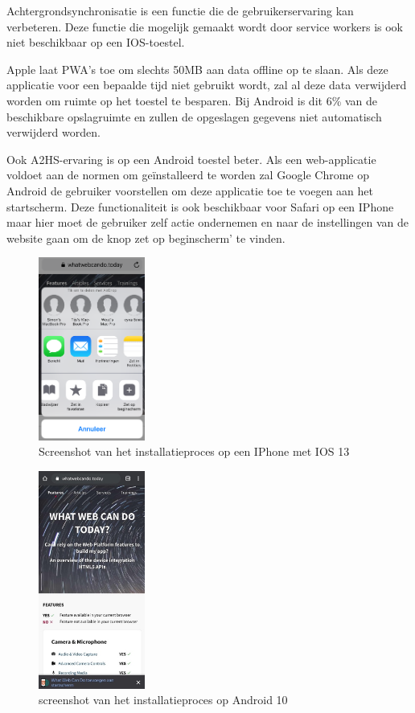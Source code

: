 	Achtergrondsynchronisatie is een functie die de gebruikerservaring kan verbeteren. Deze functie die mogelijk gemaakt wordt door service workers is ook niet beschikbaar op een IOS-toestel.
	
	Apple laat PWA's toe om slechts 50MB aan data offline op te slaan. Als deze applicatie voor een bepaalde tijd niet gebruikt wordt, zal al deze data verwijderd worden om ruimte op het toestel te besparen. Bij Android is dit 6\% van de beschikbare opslagruimte en zullen de opgeslagen gegevens niet automatisch verwijderd worden.
	
	Ook A2HS-ervaring is op een Android toestel beter. Als een web-applicatie voldoet aan de normen om geïnstalleerd te worden zal Google Chrome op Android de gebruiker voorstellen om deze applicatie toe te voegen aan het startscherm. Deze functionaliteit is ook beschikbaar voor Safari op een IPhone maar hier moet de gebruiker zelf actie ondernemen en naar de instellingen van de website gaan om de knop zet op beginscherm’ te vinden.
	
	\begin{figure}[H]
		\centering
		\includegraphics[width=35mm]{./img/installation_ios.png}
		\caption{Screenshot van het installatieproces op een IPhone met IOS 13}
	\end{figure}
	
	\begin{figure}[H]
		\centering
		\includegraphics[width=35mm]{./img/installation_android.png}
		\caption{screenshot van het installatieproces op Android 10}
	\end{figure}


